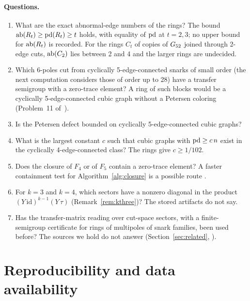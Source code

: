\paragraph{Questions.}
\begin{enumerate}
\item What are the exact abnormal-edge numbers of the rings? The bound $\mathrm{ab}(R_t) \ge \mathrm{pd}(R_t) \ge t$ holds, with equality of $\mathrm{pd}$ at $t = 2, 3$; no upper bound for $\mathrm{ab}(R_t)$ is recorded. For the rings $C_t$ of copies of $G_{52}$ joined through 2-edge cuts, $\mathrm{ab}(C_2)$ lies between 2 and 4 and the larger rings are undecided.
\item Which 6-poles cut from cyclically 5-edge-connected snarks of small order (the next computation considers those of order up to 28) have a transfer semigroup with a zero-trace element? A ring of such blocks would be a cyclically 5-edge-connected cubic graph without a Petersen coloring (Problem~11 of~\cite{GJMMMU2026}).
\item Is the Petersen defect bounded on cyclically 5-edge-connected cubic graphs?
\item What is the largest constant $c$ such that cubic graphs with $\mathrm{pd} \ge c\,n$ exist in the cyclically 4-edge-connected class? The rings give $c \ge 1/102$.
\item Does the closure of $F_4$ or of $F_5$ contain a zero-trace element? A faster containment test for Algorithm~\ref{alg:closure} is a possible route .
\item For $k = 3$ and $k = 4$, which sectors have a nonzero diagonal in the product $(Y\,\mathrm{id})^{k-1}(Y\,\tau)$ (Remark~\ref{rem:kthree})? The stored artifacts do not say.
\item Has the transfer-matrix reading over cut-space sectors, with a finite-semigroup certificate for rings of multipoles of snark families, been used before? The sources we hold do not answer (Section~\ref{sec:related}, ).
\end{enumerate}

\section{Reproducibility and data availability}\label{sec:repro}

